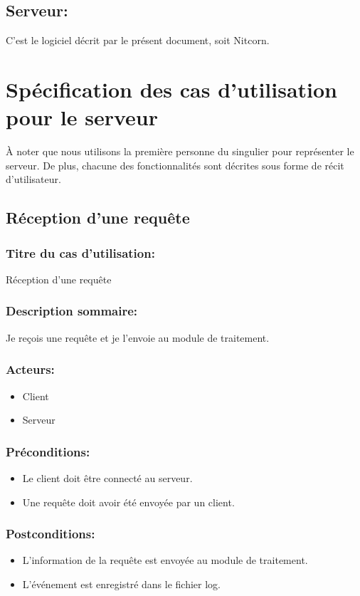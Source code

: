 \documentclass{scrreprt}
\begin{document}
\subsection{Serveur:} C'est le logiciel décrit par le présent document, soit Nitcorn.

\section{Spécification des cas d'utilisation pour le serveur} 
À noter que nous utilisons la première personne du singulier pour représenter le serveur. De plus, chacune des fonctionnalités sont décrites sous forme de récit d'utilisateur.
\subsection{Réception d'une requête}
\subsubsection{Titre du cas d'utilisation:} Réception d'une requête
\subsubsection{Description sommaire:} Je reçois une requête et je l'envoie au module de traitement.
\subsubsection{Acteurs:}
\begin{itemize}
    \item Client
    \item Serveur
\end{itemize}
\subsubsection{Préconditions:}
\begin{itemize}
	\item Le client doit être connecté au serveur.
    \item Une requête doit avoir été envoyée par un client.
\end{itemize} 
\subsubsection{Postconditions:}
\begin{itemize}
    \item  L'information de la requête est envoyée au module de traitement.
    \item  L'événement est enregistré dans le fichier log.
\end{itemize} 
\end{document}
